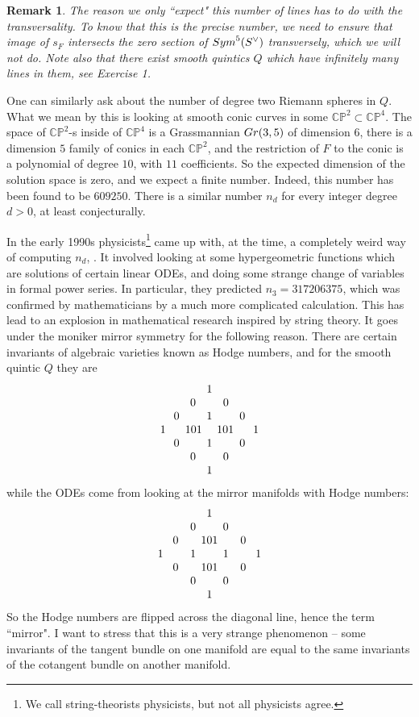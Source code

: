 \documentclass[11pt]{article}
\numberwithin{equation}{section}
\numberwithin{footnote}{section}
\newtheorem{rem}[thm]{Remark}
\newcommand{\blue}{\color{blue}}
\newcommand{\Gr}{{\rm Gr}}
\renewcommand{\P}{{\mathbb P}}
\newcommand{\C}{{\mathbb C}}
\begin{document}
\smallskip
\begin{rem}
The reason we only ``expect" this number of lines has to do with the transversality. To know that this is the precise number, we need to ensure that image of $s_F$ intersects the zero section of ${\rm Sym}^5(S^\vee)$ transversely, which we will not do. Note also that there exist smooth quintics $Q$ which have {\blue infinitely} many lines in them, see Exercise 1.
\end{rem}

\smallskip
One can similarly ask about the number of {\blue degree two} Riemann spheres in $Q$. What we mean by this is looking at smooth conic curves in some $\C\P^2\subset \C\P^4$. The space of $\C\P^2$-s inside of $\C\P^4$ is a Grassmannian $\Gr(3,5)$ of dimension $6$, there is a dimension $5$ family of conics in each $\C\P^2$, and the restriction of $F$ to the conic is a polynomial of degree $10$, with $11$ coefficients. So the expected dimension of the solution space is zero, and we expect a finite number. Indeed, this number has been found to be $609250$.
There is a similar number $n_d$ for every integer degree $d>0$, at least conjecturally.

\smallskip
In the early 1990s physicists\footnote{ We call string-theorists physicists, but not all physicists agree.} came up with, at the time, a completely weird way of computing $n_d$, \cite{CdOGP}. It involved looking at some hypergeometric functions which are solutions of certain linear ODEs, and doing some strange change of variables in formal power series. In particular, they predicted $n_3 = 317206375$, which was confirmed by mathematicians by a much more complicated calculation. This has lead to an explosion in mathematical research inspired by string theory. It goes under the moniker {\blue mirror symmetry} for the following reason. There are certain invariants of algebraic varieties known as Hodge numbers, and for the smooth quintic $Q$ they are
$$
\begin{array}{c}
1\\
0\hskip 24pt 0\\
0\hskip 24pt 1\hskip 24pt 0\\
1 \hskip 17pt 101 \hskip 13pt 101 \hskip 17pt 1\\
0\hskip 24pt 1\hskip 24pt 0\\
0\hskip 24pt 0\\
1
\end{array}
$$
while the ODEs come from looking at the {\blue mirror manifolds} with Hodge numbers:
$$
\begin{array}{c}
1\\
0\hskip 24pt 0\\
0\hskip 20pt 101\hskip 20pt 0\\
1 \hskip 24pt 1 \hskip 24pt 1 \hskip 24pt 1\\
0\hskip 20pt 101\hskip 20pt 0\\
0\hskip 24pt 0\\
1
\end{array}
$$
So the Hodge numbers are flipped across the diagonal line, hence the term ``mirror".  I want to stress that this is a very strange phenomenon -- some invariants of the tangent bundle on one manifold are equal to the same invariants of the cotangent bundle on another manifold.
\end{document}
